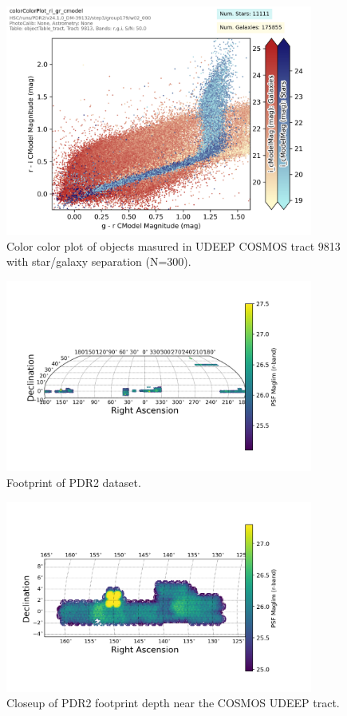  \begin{figure}
 \includegraphics[width=0.9\textwidth]{colorColor9813.png}
	 \caption{Color color plot of objects masured in UDEEP COSMOS tract 9813 with star/galaxy separation (N=300).  \label{fig:colorcolor}}
 \end{figure}


 \begin{figure}
 \includegraphics[width=0.9\textwidth]{r_maglim_pdr2.png}
	 \caption{Footprint of PDR2 dataset.  \label{fig:footprint1}}
 \end{figure}

 \begin{figure}
 \includegraphics[width=0.9\textwidth]{r-band-cosmos-pdr2.png}
	 \caption{Closeup of PDR2 footprint depth near the COSMOS UDEEP tract.  \label{fig:footprint0}}
 \end{figure}

